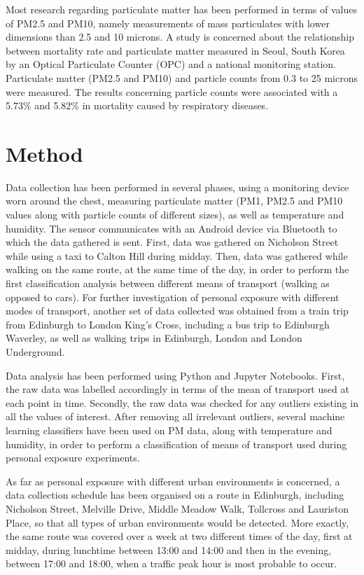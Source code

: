 \documentclass[bsc,frontabs,twoside,singlespacing, parskip,deptreport]{infthesis}     %
\begin{document}
Most research regarding particulate matter has been performed in terms of values of PM2.5 and PM10, namely measurements of mass particulates with lower dimensions than 2.5 and 10 microns. A study \cite{Cho2008} is concerned about the relationship between mortality rate and particulate matter measured in Seoul, South Korea by an Optical Particulate Counter (OPC) and a national monitoring station. Particulate matter (PM2.5 and PM10) and particle counts from 0.3 to 25 microns were measured. The results concerning particle counts were associated with a 5.73\% and 5.82\% in mortality caused by respiratory diseases.

\section{Method}

Data collection has been performed in several phases, using a monitoring device worn around the chest, measuring particulate matter (PM1, PM2.5 and PM10 values along with particle counts of different sizes), as well as temperature and humidity. The sensor communicates with an Android device via Bluetooth to which the data gathered is sent. First, data was gathered on Nicholson Street while using a taxi to Calton Hill during midday. Then, data was gathered while walking on the same route, at the same time of the day, in order to perform the first classification analysis between different means of transport (walking as opposed to cars). For further investigation of personal exposure with different modes of transport, another set of data collected was obtained from a train trip from Edinburgh to London King's Cross, including a bus trip to Edinburgh Waverley, as well as walking trips in Edinburgh, London and London Underground.

Data analysis has been performed using Python and Jupyter Notebooks. First, the raw data was labelled accordingly in terms of the mean of transport used at each point in time. Secondly, the raw data was checked for any outliers existing in all the values of interest. After removing all irrelevant outliers, several machine learning classifiers have been used on PM data, along with temperature and humidity, in order to perform a classification of means of transport used during personal exposure experiments.

As far as personal exposure with different urban environments is concerned, a data collection schedule has been organised on a route in Edinburgh, including Nicholson Street, Melville Drive, Middle Meadow Walk, Tollcross and Lauriston Place, so that all types of urban environments would be detected. More exactly, the same route was covered over a week at two different times of the day, first at midday, during lunchtime between 13:00 and 14:00 and then in the evening, between 17:00 and 18:00, when a traffic peak hour is most probable to occur.
\end{document}
